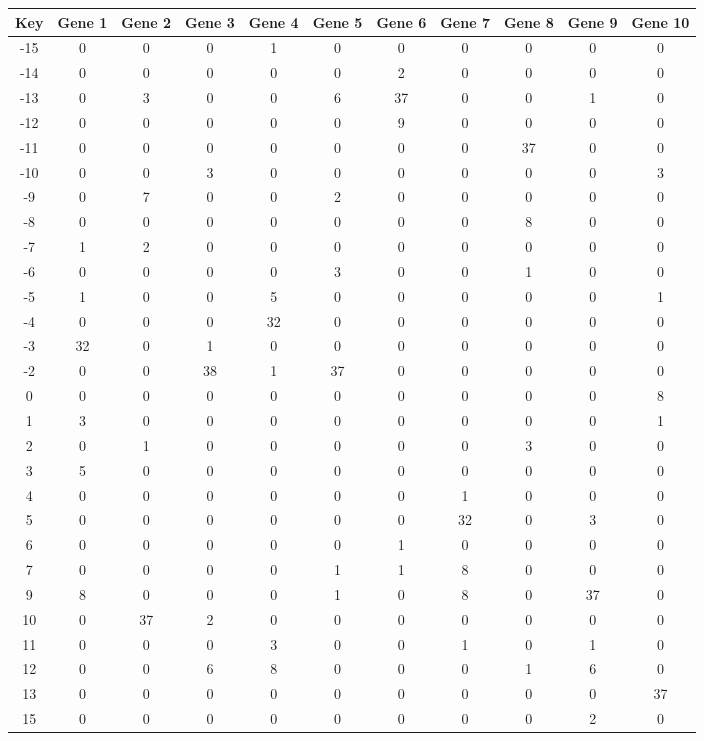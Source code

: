 \begin{tabular}{|c|c|c|c|c|c|c|c|c|c|c|}
\hline
Key & Gene 1 & Gene 2 & Gene 3 & Gene 4 & Gene 5 & Gene 6 & Gene 7 & Gene 8 & Gene 9 & Gene 10 \\
\hline
-15 & 0 & 0 & 0 & 1 & 0 & 0 & 0 & 0 & 0 & 0 \\
-14 & 0 & 0 & 0 & 0 & 0 & 2 & 0 & 0 & 0 & 0 \\
-13 & 0 & 3 & 0 & 0 & 6 & 37 & 0 & 0 & 1 & 0 \\
-12 & 0 & 0 & 0 & 0 & 0 & 9 & 0 & 0 & 0 & 0 \\
-11 & 0 & 0 & 0 & 0 & 0 & 0 & 0 & 37 & 0 & 0 \\
-10 & 0 & 0 & 3 & 0 & 0 & 0 & 0 & 0 & 0 & 3 \\
-9 & 0 & 7 & 0 & 0 & 2 & 0 & 0 & 0 & 0 & 0 \\
-8 & 0 & 0 & 0 & 0 & 0 & 0 & 0 & 8 & 0 & 0 \\
-7 & 1 & 2 & 0 & 0 & 0 & 0 & 0 & 0 & 0 & 0 \\
-6 & 0 & 0 & 0 & 0 & 3 & 0 & 0 & 1 & 0 & 0 \\
-5 & 1 & 0 & 0 & 5 & 0 & 0 & 0 & 0 & 0 & 1 \\
-4 & 0 & 0 & 0 & 32 & 0 & 0 & 0 & 0 & 0 & 0 \\
-3 & 32 & 0 & 1 & 0 & 0 & 0 & 0 & 0 & 0 & 0 \\
-2 & 0 & 0 & 38 & 1 & 37 & 0 & 0 & 0 & 0 & 0 \\
0 & 0 & 0 & 0 & 0 & 0 & 0 & 0 & 0 & 0 & 8 \\
1 & 3 & 0 & 0 & 0 & 0 & 0 & 0 & 0 & 0 & 1 \\
2 & 0 & 1 & 0 & 0 & 0 & 0 & 0 & 3 & 0 & 0 \\
3 & 5 & 0 & 0 & 0 & 0 & 0 & 0 & 0 & 0 & 0 \\
4 & 0 & 0 & 0 & 0 & 0 & 0 & 1 & 0 & 0 & 0 \\
5 & 0 & 0 & 0 & 0 & 0 & 0 & 32 & 0 & 3 & 0 \\
6 & 0 & 0 & 0 & 0 & 0 & 1 & 0 & 0 & 0 & 0 \\
7 & 0 & 0 & 0 & 0 & 1 & 1 & 8 & 0 & 0 & 0 \\
9 & 8 & 0 & 0 & 0 & 1 & 0 & 8 & 0 & 37 & 0 \\
10 & 0 & 37 & 2 & 0 & 0 & 0 & 0 & 0 & 0 & 0 \\
11 & 0 & 0 & 0 & 3 & 0 & 0 & 1 & 0 & 1 & 0 \\
12 & 0 & 0 & 6 & 8 & 0 & 0 & 0 & 1 & 6 & 0 \\
13 & 0 & 0 & 0 & 0 & 0 & 0 & 0 & 0 & 0 & 37 \\
15 & 0 & 0 & 0 & 0 & 0 & 0 & 0 & 0 & 2 & 0 \\
\hline
\end{tabular}